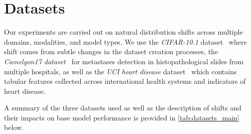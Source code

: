 \section{Datasets}
Our experiments are carried out on natural distribution shifts across multiple domains, modalities, and model types.
We use the \textit{CIFAR-10.1} dataset~\citep{cifar101} where shift comes from subtle changes in the dataset creation processes,
the \textit{Camelyon17 dataset}~\citep{camelyon} for metastases detection in histopathological slides from multiple hospitals, as well as the \textit{UCI heart disease} dataset~\citep{misc_heart_disease_45} which contains tabular features collected across international health systems and indicators of heart disease.

A summary of the three datasets used as well as the description of shifts and their impacts on base model performance is provided in \autoref{tab:datasets_main} below.
\begin{table}[!htb]
    \centering
    \setlength\tabcolsep{1.5pt}
    \renewcommand{\arraystretch}{0.5}
    \small
    \caption{\small \textbf{Datasets:} We investigate three different forms of covariate shift in two unique data modalities.
    To verify that these shifts are indeed harmful to the models, we report performance in both the shifted and unshifted domains.
    Examples and further descriptions of unshifted/shifted splits of each dataset are given in \autoref{sec:data}.}
    \label{tab:datasets_main}
\end{table}


